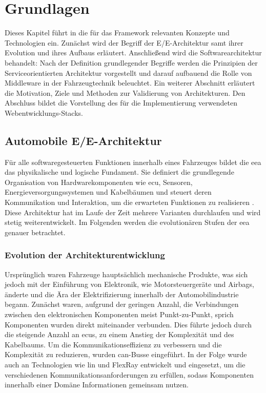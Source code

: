 \chapter{Grundlagen}
\label{sect:basics}

Dieses Kapitel führt in die für das Framework relevanten Konzepte und Technologien ein. Zunächst wird der Begriff der E/E-Architektur samt ihrer Evolution und ihres Aufbaus erläutert. Anschließend wird die Softwarearchitektur behandelt: Nach der Definition grundlegender Begriffe werden die Prinzipien der Serviceorientierten Architektur vorgestellt und darauf aufbauend die Rolle von Middleware in der Fahrzeugtechnik beleuchtet. Ein weiterer Abschnitt erläutert die Motivation, Ziele und Methoden zur Validierung von Architekturen. Den Abschluss bildet die Vorstellung des für die Implementierung verwendeten Webentwicklungs-Stacks.
\section{Automobile E/E-Architektur}
\label{sect:eearchitecture}

Für alle softwaregesteuerten Funktionen innerhalb eines Fahrzeuges bildet die \gls{eea} das physikalische und logische Fundament. Sie definiert die grundlegende Organisation von Hardwarekomponenten wie \gls{ecu}, Sensoren, Energieversorgungssystemen und Kabelbäumen und steuert deren Kommunikation und Interaktion, um die erwarteten Funktionen zu realisieren \cite{jiang2019vehicle}. Diese Architektur hat im Laufe der Zeit mehrere Varianten durchlaufen und wird stetig weiterentwickelt. Im Folgenden werden die evolutionären Stufen der \gls{eea} genauer betrachtet.

\subsection{Evolution der Architekturentwicklung}

Ursprünglich waren Fahrzeuge hauptsächlich mechanische Produkte, was sich jedoch mit der Einführung von Elektronik, wie Motorsteuergeräte und Airbags, änderte und die Ära der Elektrifizierung innerhalb der Automobilindustrie begann. Zunächst waren, aufgrund der geringen Anzahl, die Verbindungen zwischen den elektronischen Komponenten meist Punkt-zu-Punkt, sprich Komponenten wurden direkt miteinander verbunden. Dies führte jedoch durch die steigende Anzahl an \glspl{ecu}, zu einem Anstieg der Komplexität und des Kabelbaums. Um die Kommunikationseffizienz zu verbessern und die Komplexität zu reduzieren, wurden \gls{can}-Busse eingeführt. In der Folge wurde auch an Technologien wie \gls{lin} und FlexRay entwickelt und eingesetzt, um die verschiedenen Kommunikationsanforderungen zu erfüllen, sodass Komponenten innerhalb einer Domäne Informationen gemeinsam nutzen.

